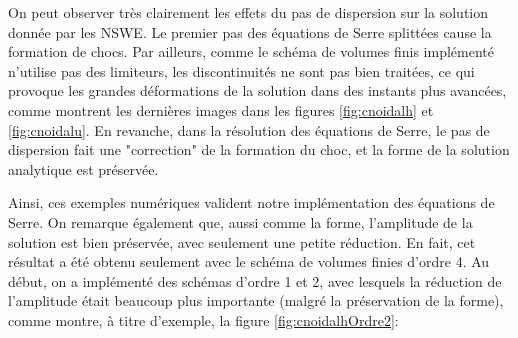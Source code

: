 \indent On peut observer très clairement les effets du pas de dispersion sur la solution donnée par les NSWE. Le premier pas des équations de Serre splittées cause la formation de chocs. Par ailleurs, comme le schéma de volumes finis implémenté n'utilise pas des limiteurs, les discontinuités ne sont pas bien traitées, ce qui provoque les grandes déformations de la solution dans des instants plus avancées, comme montrent les dernières images dans les figures \ref{fig:cnoidalh} et \ref{fig:cnoidalu}. En revanche, dans la résolution des équations de Serre, le pas de dispersion fait une "correction" de la formation du choc, et la forme de la solution analytique est préservée.

\indent Ainsi, ces exemples numériques valident notre implémentation des équations de Serre. On remarque également que, aussi comme la forme, l'amplitude de la solution est bien préservée, avec seulement une petite réduction. En fait, cet résultat a été obtenu seulement avec le schéma de volumes finies d'ordre 4. Au début, on a implémenté des schémas d'ordre 1 et 2, avec lesquels la réduction de l'amplitude était beaucoup plus importante (malgré la préservation de la forme), comme montre, à titre d'exemple, la figure \ref{fig:cnoidalhOrdre2}:

